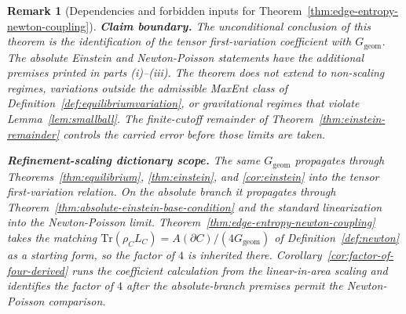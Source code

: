 \documentclass[11pt]{article}
\newtheorem{remark}[theorem]{Remark}
\begin{document}
\begin{remark}[Dependencies and forbidden inputs for Theorem~\ref{thm:edge-entropy-newton-coupling}]
\textbf{Claim boundary.} The unconditional conclusion of this theorem is
the identification of the tensor first-variation coefficient with
\(G_{\mathrm{geom}}\). The absolute Einstein and Newton-Poisson statements
have the additional premises printed in parts (i)--(iii). The theorem does
not extend to non-scaling regimes, variations outside the admissible MaxEnt
class of Definition~\ref{def:equilibriumvariation}, or gravitational regimes
that violate Lemma~\ref{lem:smallball}. The finite-cutoff remainder of
Theorem~\ref{thm:einstein-remainder} controls the carried error before those
limits are taken.

\textbf{Refinement-scaling dictionary scope.} The same
\(G_{\mathrm{geom}}\) propagates through
Theorems~\ref{thm:equilibrium}, \ref{thm:einstein}, and
\ref{cor:einstein} into the tensor first-variation relation. On the absolute
branch it propagates through
Theorem~\ref{thm:absolute-einstein-base-condition} and the standard
linearization into the Newton-Poisson limit.
Theorem~\ref{thm:edge-entropy-newton-coupling} takes the matching
\(\mathrm{Tr}(\rho_C L_C)=A(\partial C)/(4G_{\mathrm{geom}})\) of
Definition~\ref{def:newton} as a starting form, so the factor of \(4\) is
inherited there. Corollary~\ref{cor:factor-of-four-derived} runs the
coefficient calculation from the linear-in-area scaling and identifies the
factor of \(4\) after the absolute-branch premises permit the Newton-Poisson
comparison.
\end{remark}
\end{document}
